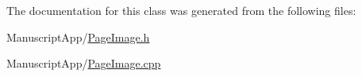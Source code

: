 The documentation for this class was generated from the following files\+:\begin{DoxyCompactItemize}
\item 
Manuscript\+App/\hyperlink{_page_image_8h}{Page\+Image.\+h}\item 
Manuscript\+App/\hyperlink{_page_image_8cpp}{Page\+Image.\+cpp}\end{DoxyCompactItemize}
